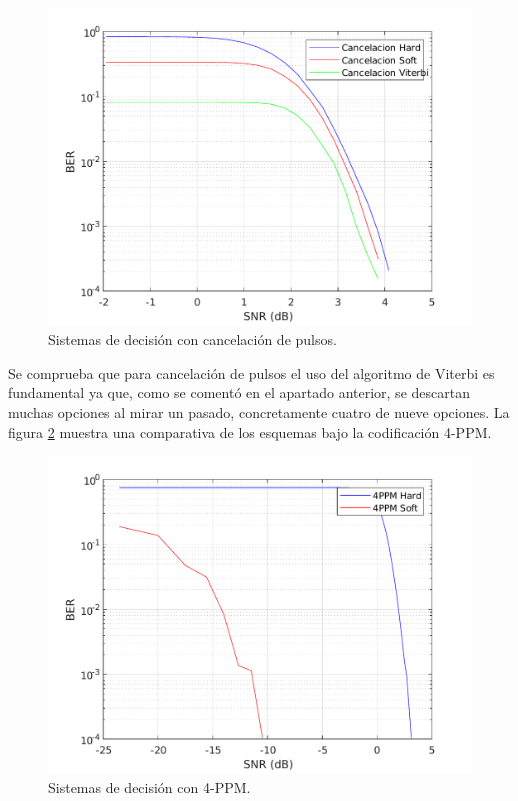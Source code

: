 \begin{figure}[ht]
    \centering
    \includegraphics[scale=0.75]{./figuras/cancelacion.pdf}
    \caption{\small{Sistemas de decisión con cancelación de pulsos.}}
    \label{cancelacion}%
\end{figure}

Se comprueba que para cancelación de pulsos el uso del algoritmo de Viterbi 
es fundamental ya que, como se comentó en el apartado anterior, se descartan muchas 
opciones al mirar un pasado, concretamente cuatro de nueve opciones.
\newpage
La figura \ref{4ppm} muestra una comparativa de los esquemas bajo 
la codificación 4-PPM.

\begin{figure}[ht]
    \centering
    \includegraphics[scale=0.75]{./figuras/4ppm.pdf}
    \caption{\small{Sistemas de decisión con 4-PPM.}}
    \label{4ppm}%
\end{figure}

